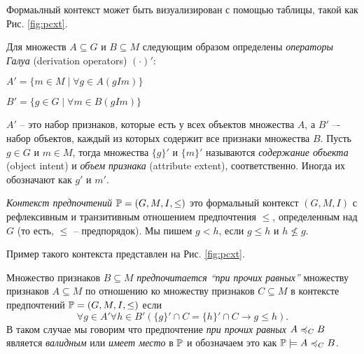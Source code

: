 		Формаьлный контекст может быть визуализирован с помощью таблицы, такой как Рис. \ref{fig:pcxt}.
		
		Для множеств $A \subseteq G$ и $B \subseteq M$ следующим образом определены \emph{операторы Галуа} (derivation operators) $(\cdot)'$:
		\begin{center}
			$A'=\{m \in M \mid \forall g \in A (g I m)\}$
			
			$B'=\{g \in G \mid \forall m \in B (g I m)\}$
		\end{center}
		$A'$ – это набор признаков, которые есть у всех объектов множества $A$, а $B'$  –- набор объектов, каждый из которых содержит все признаки множества $B$. Пусть $g \in G$ и $m \in M$, тогда множества $\{g\}'$ и $\{m\}'$ называются \emph{содержание объекта} (object intent) и \emph{объем признака} (attribute extent), соответственно. Иногда их обозначают как $g'$ и $m'$.
		
		\begin{definition}
			\emph{Контекст предпочтений} $\mathbb{P} = (G, M, I, \leq)$ это формальный контекст $(G, M, I)$ с рефлексивным и транзитивным отношением предпочтения $\leq$, определенным над $G$ (то есть, $\leq$ – предпорядок). Мы пишем $g < h$, если $g \leq h$ и $h \not\leq g$.
		\end{definition}
		
		Пример такого контекста представлен на Рис. \ref{fig:pcxt}.
		
		\begin{definition}
			Множество признаков $B \subseteq M$ \emph{предпочитается \enquote{при прочих равных}} множеству признаков $A \subseteq M$ по отношению ко множеству признаков $C \subseteq M$ в контексте предпочтений $\mathbb{P} = (G, M, I, \leq)$ если 
			\[\forall g \in A' \forall h \in B'(\{g\}' \cap C = \{h\}' \cap C \to g \leq h).\]
			В таком случае мы говорим что предпочтение \emph{при прочих равных} $A \preccurlyeq_{C} B$ является \emph{валидным} или \emph{имеет место} в $\mathbb{P}$ и обозначаем это как $\mathbb{P} \models A \preccurlyeq_{C} B$.
		\end{definition}
	
